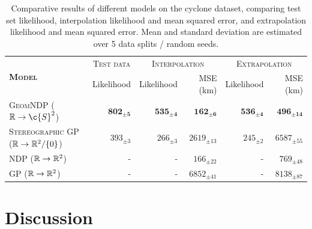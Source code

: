 \begin{table}[t]
	\centering
	\small
	\begin{tabular}{lrrrrr}
		\toprule
		\multirow{2}{*}{\textsc{\textbf{Model}}}                  & \multicolumn{1}{c}{\textsc{Test data}} & \multicolumn{2}{c}{\textsc{Interpolation}} & \multicolumn{2}{c}{\textsc{Extrapolation}}                                                    \\
		                                                          & {Likelihood}                           & {Likelihood}                               & {MSE (km)}                                 & {Likelihood}           & {MSE (km)}              \\
		\midrule
		\rowcolor{pearDark!20} \textsc{GeomNDP  (\(\R\to\c{S}^2\))} & \(\mathbf{802_{\pm 5}}\)                 & \(\mathbf{535_{\pm 4}}\)                     & \(\mathbf{162_{\pm 6}}\)                     & \(\mathbf{536_{\pm 4}}\) & \(\mathbf{496_{\pm 14}}\) \\
		\textsc{Stereographic GP (\(\mathbb{R} \to \mathbb{R}^2/\{0\}\))}           & \(393_{\pm 3}\)                          & \(266_{\pm 3}\)                              & \(2619_{\pm 13}\)                            & \(245_{\pm 2}\)          & \(6587_{\pm 55}\)         \\
		\textsc{NDP (\(\mathbb{R}\to\mathbb{R}^2\))}                                & -                                      & -                                          & \({166_{\pm 22}}\)                           & -                      & \(769_{\pm 48}\)          \\
		\textsc{GP (\(\mathbb{R}\to\mathbb{R}^2\))}                                 & -                                      & -                                          & \(6852_{\pm 41}\)                            & -                      & \(8138_{\pm 87}\)         \\
		\bottomrule
	\end{tabular}
	\caption{
		Comparative results of different models on the cyclone dataset, comparing test set likelihood, interpolation likelihood and mean squared error, and extrapolation likelihood and mean squared error.
		Mean and standard deviation are estimated over 5 data splits / random seeds.
	}
	\label{tab:cyclone_results}
\end{table}

\section{Discussion}
\label{sec:discussion}

